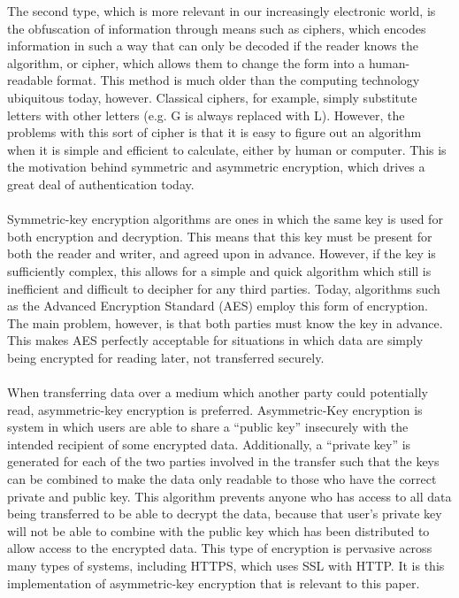 \documentclass[twoside]{article}
\begin{document}
\begin{multicols}{2}
The second type, which is more relevant in our increasingly electronic world, is the obfuscation of information through means such as ciphers, which encodes information in such a way that can only be decoded if the reader knows the algorithm, or cipher, which allows them to change the form into a human-readable format. This method is much older than the computing technology ubiquitous today, however. Classical ciphers, for example, simply substitute letters with other letters (e.g. G is always replaced with L). However, the problems with this sort of cipher is that it is easy to figure out an algorithm when it is simple and efficient to calculate, either by human or computer. This is the motivation behind symmetric and asymmetric encryption, which drives a great deal of authentication today. \\
\\
Symmetric-key encryption algorithms are ones in which the same key is used for both encryption and decryption. This means that this key must be present for both the reader and writer, and agreed upon in advance. However, if the key is sufficiently complex, this allows for a simple and quick algorithm which still is inefficient and difficult to decipher for any third parties. Today, algorithms such as the Advanced Encryption Standard (AES) employ this form of encryption. The main problem, however, is that both parties must know the key in advance. This makes AES perfectly acceptable for situations in which data are simply being encrypted for reading later, not transferred securely. \\
\\
When transferring data over a medium which another party could potentially read, asymmetric-key encryption is preferred. Asymmetric-Key encryption is system in which users are able to share a “public key” insecurely with the intended recipient of some encrypted data. Additionally, a “private key” is generated for each of the two parties involved in the transfer such that the keys can be combined to make the data only readable to those who have the correct private and public key. This algorithm prevents anyone who has access to all data being transferred to be able to decrypt the data, because that user’s private key will not be able to combine with the public key which has been distributed to allow access to the encrypted data. This type of encryption is pervasive across many types of systems, including HTTPS, which uses SSL with HTTP.  It is this implementation of asymmetric-key encryption that is relevant to this paper.\\


\end{multicols}
\end{document}
